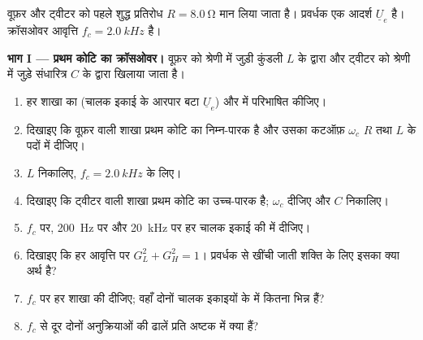 \begin{problem}
\label{pb:b1:filters-transfer-functions:1}
वूफ़र और ट्वीटर को पहले शुद्ध प्रतिरोध
$R = \qty{8.0}{\ohm}$ मान लिया जाता है। प्रवर्धक एक आदर्श 
$\underline U_e$ है। क्रॉसओवर आवृत्ति $f_c = \qty{2.0}{kHz}$ है।

\medskip
\noindent\textbf{भाग I --- प्रथम कोटि का क्रॉसओवर।}
वूफ़र को श्रेणी में जुड़ी कुंडली $L$ के द्वारा और ट्वीटर को श्रेणी में जुड़े
संधारित्र $C$ के द्वारा खिलाया जाता है।
\begin{enumerate}
  \item हर शाखा का  (चालक इकाई के आरपार  बटा
        $\underline U_e$) और  में  परिभाषित कीजिए।
  \item दिखाइए कि वूफ़र वाली शाखा प्रथम कोटि का निम्न-पारक है और उसका
        कटऑफ़ $\omega_c$ $R$ तथा $L$ के पदों में दीजिए।
  \item $L$ निकालिए, $f_c = \qty{2.0}{kHz}$ के लिए।
  \item दिखाइए कि ट्वीटर वाली शाखा प्रथम कोटि का उच्च-पारक है;
        $\omega_c$ दीजिए और $C$ निकालिए।
  \item $f_c$ पर, \qty{200}{Hz} पर और \qty{20}{kHz} पर हर चालक इकाई की
          में दीजिए।
  \item दिखाइए कि हर आवृत्ति पर $G_L^2 + G_H^2 = 1$। प्रवर्धक से खींची
        जाती शक्ति के लिए इसका क्या अर्थ है?
  \item $f_c$ पर हर शाखा की  दीजिए; वहाँ दोनों
        चालक इकाइयों के   में कितना भिन्न हैं?
  \item $f_c$ से दूर दोनों अनुक्रियाओं की ढालें प्रति अष्टक  में
        क्या हैं?
\end{enumerate}


\end{problem}
